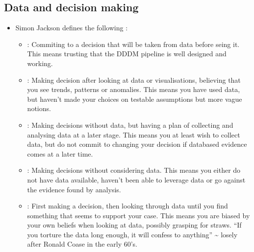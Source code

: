 \documentclass[letterpaper,10pt,english]{jupyterBook}
\begin{document}
\subsection{Data and decision making}
\label{\detokenize{1_Decision_making/Decision_making:data-and-decision-making}}\begin{itemize}
\item {} 
\sphinxAtStartPar
Simon Jackson defines the following :
\begin{itemize}
\item {} 
\sphinxAtStartPar
{}: Commiting to a decision that will be taken from data before seing it. This means trusting that the DDDM pipeline is well designed and working.

\item {} 
\sphinxAtStartPar
{}: Making decision after looking at data or visualisations, believing that you see trends, patterns or anomalies. This means you have used data, but haven’t made your choices on testable assumptions but more vague notions.

\item {} 
\sphinxAtStartPar
{}: Making decisions without data, but having a plan of collecting and analysing data at a later stage. This means you at least wish to collect data, but do not commit to changing your decision if data\sphinxhyphen{}based evidence comes at a later time.

\item {} 
\sphinxAtStartPar
{}: Making decisions without considering data. This means you either do not have data available, haven’t been able to leverage data or go against the evidence found by analysis.

\item {} 
\sphinxAtStartPar
{}: First making a decision, then looking through data until you find something that seems to support your case. This means you are biased by your own beliefs when looking at data, possibly grasping for straws. “If you torture the data long enough, it will confess to anything” \textasciitilde{} losely after Ronald Coase in the early 60’s.

\end{itemize}

\end{itemize}
\end{document}
